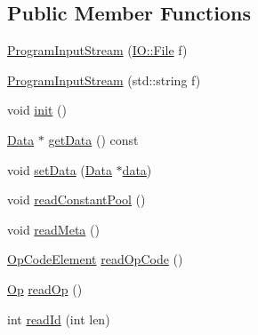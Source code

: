 \subsection*{Public Member Functions}
\begin{DoxyCompactItemize}
\item 
\mbox{\hyperlink{class_erable_1_1_erable_1_1_program_1_1_program_input_stream_a2e2f0fdbb66dd072f1accd054793e0f7}{Program\+Input\+Stream}} (\mbox{\hyperlink{class_erable_1_1_i_o_1_1_file}{I\+O\+::\+File}} f)
\item 
\mbox{\hyperlink{class_erable_1_1_erable_1_1_program_1_1_program_input_stream_a4f21de1b29b6b96ce5db949b342a8c8a}{Program\+Input\+Stream}} (std\+::string f)
\item 
void \mbox{\hyperlink{class_erable_1_1_erable_1_1_program_1_1_program_input_stream_aa7c5bf2235a10eba3f28558eb2e0f4b1}{init}} ()
\item 
\mbox{\hyperlink{struct_erable_1_1_erable_1_1_program_1_1_data}{Data}} $\ast$ \mbox{\hyperlink{class_erable_1_1_erable_1_1_program_1_1_program_input_stream_af5e34cf14d6d18cfc2afe2434652769f}{get\+Data}} () const
\item 
void \mbox{\hyperlink{class_erable_1_1_erable_1_1_program_1_1_program_input_stream_a6efb16bab4152ac5e5e8f9286c571de0}{set\+Data}} (\mbox{\hyperlink{struct_erable_1_1_erable_1_1_program_1_1_data}{Data}} $\ast$\mbox{\hyperlink{class_erable_1_1_erable_1_1_program_1_1_program_input_stream_a61bf88598cb82fe5fdf78c21aaf8cb35}{data}})
\item 
void \mbox{\hyperlink{class_erable_1_1_erable_1_1_program_1_1_program_input_stream_adedae27f952b2dc0723de5980323e019}{read\+Constant\+Pool}} ()
\item 
void \mbox{\hyperlink{class_erable_1_1_erable_1_1_program_1_1_program_input_stream_ab5c923430abc6b7a97b24952f6b541ce}{read\+Meta}} ()
\item 
\mbox{\hyperlink{class_erable_1_1_op_code_element}{Op\+Code\+Element}} \mbox{\hyperlink{class_erable_1_1_erable_1_1_program_1_1_program_input_stream_a7e61ebecb198d6dac5d4db986724ddf3}{read\+Op\+Code}} ()
\item 
\mbox{\hyperlink{struct_erable_1_1_erable_1_1_program_1_1_op}{Op}} \mbox{\hyperlink{class_erable_1_1_erable_1_1_program_1_1_program_input_stream_a8af597c49b672a6d35cb87bc1aab3afa}{read\+Op}} ()
\item 
int \mbox{\hyperlink{class_erable_1_1_erable_1_1_program_1_1_program_input_stream_a99b34dec50705863be93cd1dec31c79f}{read\+Id}} (int len)
\end{DoxyCompactItemize}
